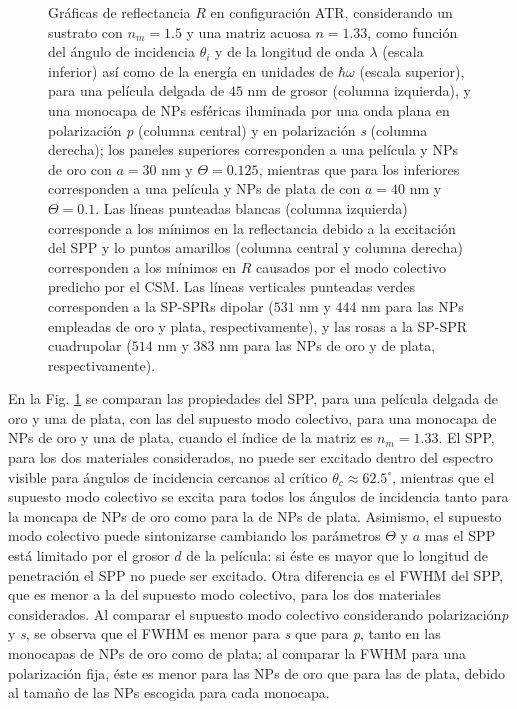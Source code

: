 \begin{figure}[h!]
\caption{Gráficas de reflectancia $R$ en configuración ATR, considerando un sustrato con $n_m=1.5$ y una matriz acuosa $n=1.33$, como función del ángulo de incidencia $\theta_i$ y de la longitud de onda $\lambda$ (escala inferior) así como de la energía en unidades de $\hbar\omega$ (escala superior), para una película delgada de $45$ nm de grosor (columna izquierda), y una monocapa de NPs esféricas iluminada por una onda plana en polarización \emph{p} (columna central) y en polarización \emph{s} (columna derecha); los paneles superiores corresponden a una película y NPs de oro con $a=30$ nm y $\Theta=0.125$, mientras que para los inferiores corresponden a una película y NPs de plata de con $a=40$ nm y $\Theta=0.1$.  Las líneas punteadas blancas (columna izquierda) corresponde a los mínimos en la reflectancia debido a la excitación del SPP y lo puntos amarillos (columna central y columna derecha) corresponden a los mínimos en $R$ causados por el modo colectivo predicho por el CSM. Las líneas verticales punteadas verdes corresponden a la SP-SPRs dipolar ($531$ nm y $444$ nm para las NPs empleadas de oro y plata, respectivamente), y las rosas a la SP-SPR cuadrupolar ($514$ nm y $383$ nm para las NPs de oro y de plata, respectivamente).}
\label{fig:SPPCSM}
\end{figure}

En la Fig. \ref{fig:SPPCSM} se comparan las propiedades del SPP, para una película delgada de oro y una de plata, con las del supuesto modo colectivo, para una monocapa de NPs de oro y una de plata, cuando el índice de la matriz es $n_m=1.33$. El SPP, para los dos materiales considerados, no puede ser excitado dentro del espectro visible para ángulos de incidencia cercanos al crítico $\theta_c\approx 62.5^\circ$, mientras que el supuesto modo colectivo se excita para todos los ángulos de incidencia tanto para la moncapa de NPs de oro como para la de NPs de plata. Asimismo, el supuesto modo colectivo puede sintonizarse  cambiando los parámetros $\Theta$ y $a$ mas el SPP está limitado por el grosor $d$ de la película: si éste es mayor que lo longitud de penetración el SPP no puede ser excitado. Otra diferencia es el FWHM del SPP, que es menor a la del supuesto modo colectivo, para los dos materiales considerados. Al comparar el supuesto modo colectivo considerando polarización\emph{p} y \emph{s},  se observa  que el FWHM es menor para \emph{s} que para \emph{p}, tanto en las monocapas de NPs de oro como de plata; al comparar la FWHM para una polarización fija, éste es menor para las NPs de oro que para las de plata, debido al tamaño de las NPs escogida para cada monocapa.

